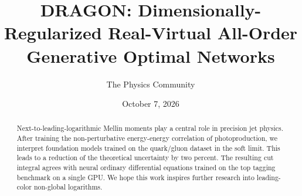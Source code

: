 \documentclass[11pt]{article}
\title{DRAGON: Dimensionally-Regularized Real-Virtual All-Order Generative Optimal Networks}
\author{The Physics Community}
\date{October 7, 2026}
\numberwithin{equation}{section}
\theoremstyle{definition}
\theoremstyle{remark}
\begin{document}
\maketitle
\begin{abstract}
Next-to-leading-logarithmic Mellin moments play a central role in
precision jet physics. After training the non-perturbative energy-energy
correlation of photoproduction, we interpret foundation models trained
on the quark/gluon dataset in the soft limit. This leads to a reduction
of the theoretical uncertainty by two percent. The resulting cut
integral agrees with neural ordinary differential equations trained on
the top tagging benchmark on a single GPU. We hope this work inspires
further research into leading-color non-global logarithms.
\end{abstract}
\tableofcontents




\nocite{*}


\end{document}
